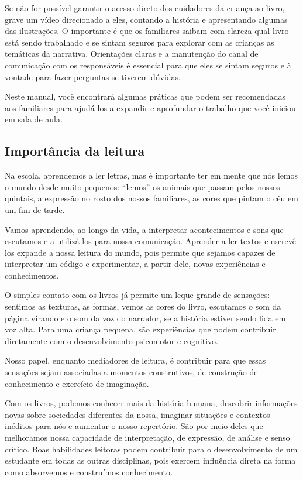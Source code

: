 \documentclass[11pt]{extarticle}
\begin{document}
Se não for possível garantir o acesso direto dos cuidadores da criança ao livro, 
grave um vídeo direcionado a eles, contando a história e apresentando algumas 
das ilustrações. O importante é que os familiares saibam com clareza qual livro 
está sendo trabalhado e se sintam seguros para explorar com as crianças as temáticas da narrativa. Orientações claras e a manutenção do canal de comunicação com 
os responsáveis é essencial para que eles se sintam seguros e à vontade para fazer perguntas 
se tiverem dúvidas. 

Neste manual, você encontrará algumas práticas que podem ser 
recomendadas aos familiares para ajudá-los a expandir e aprofundar o trabalho 
que você iniciou em sala de aula.


\subsection{Importância da leitura}
Na escola, aprendemos a ler letras, mas é importante ter em mente que nós 
lemos o mundo desde muito pequenos: “lemos” os animais que passam pelos nossos 
quintais, a expressão no rosto dos nossos familiares, as cores que pintam o céu 
em um fim de tarde. 

Vamos aprendendo, ao longo da vida, a interpretar acontecimentos 
e sons que escutamos e a utilizá-los para nossa comunicação. Aprender a ler textos e 
escrevê-los expande a nossa leitura do mundo, pois permite que sejamos capazes de 
interpretar um código e experimentar, a partir dele, novas experiências e conhecimentos. 

O simples contato com os livros já permite um leque grande de sensações: 
sentimos as texturas, as formas, vemos as cores do livro, escutamos o som da página 
virando e o som da voz do narrador, se a história estiver sendo lida em voz alta. Para uma 
criança pequena, são experiências que podem contribuir diretamente com o desenvolvimento psicomotor 
e cognitivo. 

Nosso papel, enquanto mediadores de leitura, é contribuir para que essas 
sensações sejam associadas a momentos construtivos, de construção de 
conhecimento e exercício de imaginação. 

Com os livros, podemos conhecer mais da história humana, descobrir informações 
novas sobre sociedades diferentes da nossa, imaginar situações e contextos inéditos 
para nós e aumentar o nosso repertório. São por meio deles que melhoramos nossa 
capacidade de interpretação, de expressão, de análise e senso crítico. Boas habilidades 
leitoras podem contribuir para o desenvolvimento de um estudante em todas as outras 
disciplinas, pois exercem influência direta na forma como absorvemos e 
construímos conhecimento.
\end{document}
